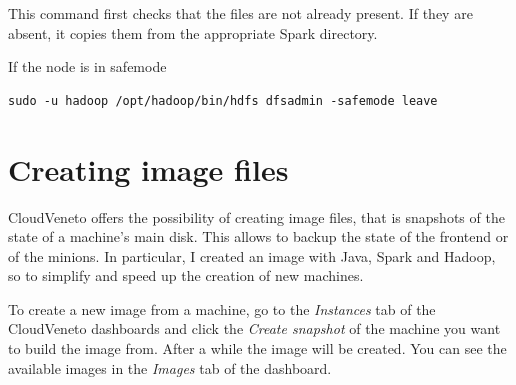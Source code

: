 \documentclass[justified]{tufte-handout}
\begin{document}
This command first checks that the files are not already present. If
they are absent, it copies them from the appropriate Spark directory.

If the node is in safemode

\begin{verbatim}
sudo -u hadoop /opt/hadoop/bin/hdfs dfsadmin -safemode leave
\end{verbatim}

\appendix

\section{Creating image files}\label{creating-image-files}

\label{sec:creating-images}

CloudVeneto offers the possibility of creating image files, that is
snapshots of the state of a machine's main disk. This allows to backup
the state of the frontend or of the minions. In particular, I created an
image with Java, Spark and Hadoop, so to simplify and speed up the
creation of new machines.

To create a new image from a machine, go to the \emph{Instances} tab of
the CloudVeneto dashboards and click the \emph{Create snapshot} of the
machine you want to build the image from. After a while the image will
be created. You can see the available images in the \emph{Images} tab of
the dashboard.
\end{document}
